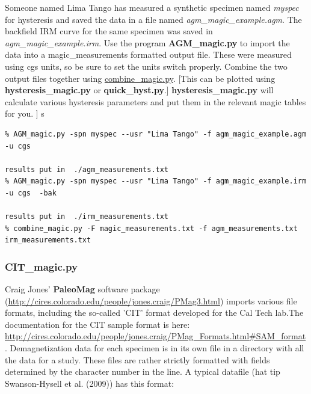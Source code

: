 \documentclass[11pt]{book}
\begin{document}
{{{Someone named Lima Tango has measured a  synthetic specimen named {\it myspec}  for hysteresis and saved the data in a file named {\it agm\_magic\_example.agm}.   The backfield IRM curve for the same specimen was saved in {\it agm\_magic\_example.irm}.  Use the program {\bf AGM\_magic.py} to import the data into a magic\_measurements formatted output file.  These were measured using cgs units, so be sure to set the units switch properly.   Combine the two output files together using \href{#combine_magic.py}{combine\_magic.py}.    [This can be plotted using {\bf hysteresis\_magic.py} or {\bf quick\_hyst.py}.]    {\bf hysteresis\_magic.py} will calculate various hysteresis parameters and put them in the relevant magic tables for you.  ]   
s
\begin{verbatim}
% AGM_magic.py -spn myspec --usr "Lima Tango" -f agm_magic_example.agm -u cgs 

results put in  ./agm_measurements.txt
% AGM_magic.py -spn myspec --usr "Lima Tango" -f agm_magic_example.irm -u cgs  -bak

results put in  ./irm_measurements.txt
% combine_magic.py -F magic_measurements.txt -f agm_measurements.txt irm_measurements.txt

\end{verbatim}



\subsubsection{CIT\_magic.py}

 Craig Jones' {\bf PaleoMag} software package (\url{http://cires.colorado.edu/people/jones.craig/PMag3.html}) imports various file formats, including the so-called 'CIT' format developed for the  Cal Tech lab.The documentation for the CIT sample format is here: \url{http://cires.colorado.edu/people/jones.craig/PMag_Formats.html#SAM_format}.    
 Demagnetization data for each specimen is in its own file in a directory with all the data for a study.  
These files are rather strictly formatted with fields determined by the character number in the line.   A typical datafile (hat tip Swanson-Hysell et al. (2009)) \nocite{swansonhysell09} has this format:

}}}
\end{document}
